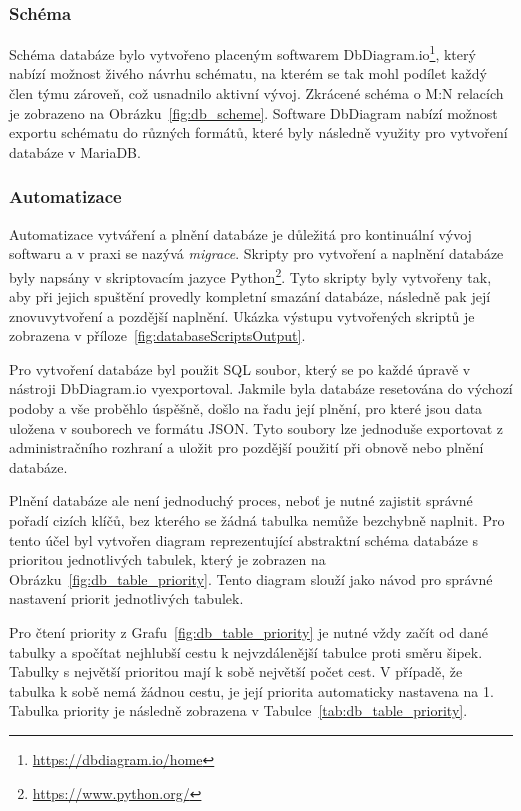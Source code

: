 \subsubsection*{Schéma}
\label{subsubsec:implementation-technologies-database-scheme}
Schéma databáze bylo vytvořeno placeným softwarem DbDiagram.io\footnote{\href{https://dbdiagram.io/home}{https://dbdiagram.io/home}}, který nabízí možnost živého návrhu schématu, na kterém se tak mohl podílet každý člen týmu zároveň, což usnadnilo aktivní vývoj. Zkrácené schéma o M:N relacích je zobrazeno na Obrázku~\ref{fig:db_scheme}. Software DbDiagram nabízí možnost exportu schématu do různých formátů, které byly následně využity pro vytvoření databáze v MariaDB\@.

\subsubsection*{Automatizace}
\label{subsubsec:implementation-technologies-database-automatization}
Automatizace vytváření a plnění databáze je důležitá pro kontinuální vývoj softwaru a v praxi se nazývá \textit{migrace}. Skripty pro vytvoření a naplnění databáze byly napsány v skriptovacím jazyce Python\footnote{\href{https://www.python.org/}{https://www.python.org/}}. Tyto skripty byly vytvořeny tak, aby při jejich spuštění provedly kompletní smazání databáze, následně pak její znovuvytvoření a pozdější naplnění. Ukázka výstupu vytvořených skriptů je zobrazena v příloze~\ref{fig:databaseScriptsOutput}.

Pro vytvoření databáze byl použit SQL soubor, který se po každé úpravě v nástroji DbDiagram.io vyexportoval. Jakmile byla databáze resetována do výchozí podoby a vše proběhlo úspěšně, došlo na řadu její plnění, pro které jsou data uložena v souborech ve formátu JSON. Tyto soubory lze jednoduše exportovat z administračního rozhraní a uložit pro pozdější použití při obnově nebo plnění databáze.

Plnění databáze ale není jednoduchý proces, neboť je nutné zajistit správné pořadí cizích klíčů, bez kterého se žádná tabulka nemůže bezchybně naplnit. Pro tento účel byl vytvořen diagram reprezentující abstraktní schéma databáze s prioritou jednotlivých tabulek, který je zobrazen na Obrázku~\ref{fig:db_table_priority}. Tento diagram slouží jako návod pro správné nastavení priorit jednotlivých tabulek.

Pro čtení priority z Grafu~\ref{fig:db_table_priority} je nutné vždy začít od dané tabulky a spočítat nejhlubší cestu k nejvzdálenější tabulce proti směru šipek. Tabulky s největší prioritou mají k sobě největší počet cest. V případě, že tabulka k sobě nemá žádnou cestu, je její priorita automaticky nastavena na 1. Tabulka priority je následně zobrazena v Tabulce~\ref{tab:db_table_priority}.

